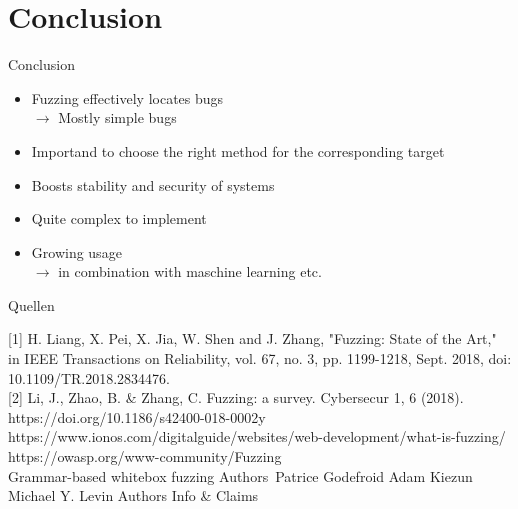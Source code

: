 \documentclass{beamer}
\begin{document}
\section{Conclusion}
\begin{frame}{Conclusion}
 \begin{itemize}
 \item Fuzzing effectively locates bugs\\
 $\rightarrow$ Mostly simple bugs
 \item Importand to choose the right method for the corresponding target
 \item Boosts stability and security of systems
  \item Quite complex to implement\\
  \item Growing usage\\
  $\rightarrow$ in combination with maschine learning etc.
 \end{itemize}

\end{frame}
\begin{frame}{Quellen}

[1] H. Liang, X. Pei, X. Jia, W. Shen and J. Zhang, "Fuzzing: State of the Art," in IEEE Transactions on Reliability, vol. 67, no. 3, pp. 1199-1218, Sept. 2018, doi: 10.1109/TR.2018.2834476.\\

[2] Li, J., Zhao, B. \& Zhang, C. Fuzzing: a survey. Cybersecur 1, 6 (2018). https://doi.org/10.1186/s42400-018-0002\-y\\
https://www.ionos.com/digitalguide/websites/web-development/what-is-fuzzing/\\
https://owasp.org/www-community/Fuzzing\\
Grammar-based whitebox fuzzing
Authors\
Patrice Godefroid
Adam Kiezun
Michael Y. Levin
Authors Info \& Claims


\end{frame}
\end{document}
